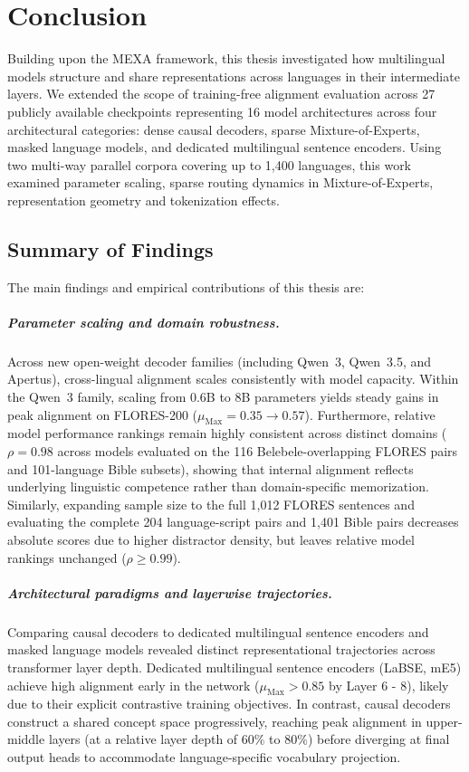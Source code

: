 \chapter{Conclusion}
\label{ch:conclusion}

Building upon the MEXA framework, this thesis investigated how multilingual models structure and share representations across languages in their intermediate layers. We extended the scope of training-free alignment evaluation across 27 publicly available checkpoints representing 16 model architectures across four architectural categories: dense causal decoders, sparse Mixture-of-Experts, masked language models, and dedicated multilingual sentence encoders. Using two multi-way parallel corpora covering up to 1,400 languages, this work examined parameter scaling, sparse routing dynamics in Mixture-of-Experts, representation geometry and tokenization effects.

\section{Summary of Findings}
\label{sec:conclusion-summary}

The main findings and empirical contributions of this thesis are:

\paragraph{Parameter scaling and domain robustness.}
Across new open-weight decoder families (including Qwen~3, Qwen~3.5, and Apertus), cross-lingual alignment scales consistently with model capacity. Within the Qwen~3 family, scaling from 0.6B to 8B parameters yields steady gains in peak alignment on FLORES-200 ($\mu_{\text{Max}} = 0.35 \rightarrow 0.57$). Furthermore, relative model performance rankings remain highly consistent across distinct domains ($\rho = 0.98$ across models evaluated on the 116 Belebele-overlapping FLORES pairs and 101-language Bible subsets), showing that internal alignment reflects underlying linguistic competence rather than domain-specific memorization. Similarly, expanding sample size to the full 1,012 FLORES sentences and evaluating the complete 204 language-script pairs and 1,401 Bible pairs decreases absolute scores due to higher distractor density, but leaves relative model rankings unchanged ($\rho \ge 0.99$).

\paragraph{Architectural paradigms and layerwise trajectories.}
Comparing causal decoders to dedicated multilingual sentence encoders and masked language models revealed distinct representational trajectories across transformer layer depth. Dedicated multilingual sentence encoders (LaBSE, mE5) achieve high alignment early in the network ($\mu_{\text{Max}} > 0.85$ by Layer 6 - 8), likely due to their explicit contrastive training objectives. In contrast, causal decoders construct a shared concept space progressively, reaching peak alignment in upper-middle layers (at a relative layer depth of 60\% to 80\%) before diverging at final output heads to accommodate language-specific vocabulary projection.

